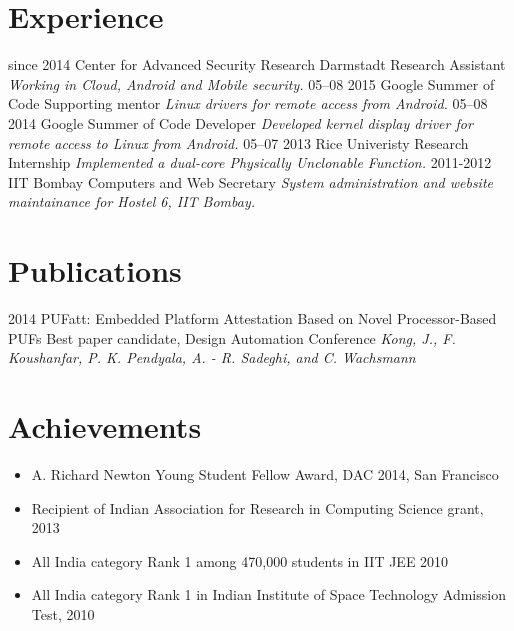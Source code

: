 \documentclass[]{friggeri-cv}
\begin{document}
\section{Experience}

\begin{entrylist}
  \entry
    {since 2014}
    {Center for Advanced Security Research Darmstadt}
    {Research Assistant}
    {\emph{Working in Cloud, Android and Mobile security.}}
  \entry
    {05–08 2015}
    {Google Summer of Code}
    {Supporting mentor}
    {\emph{Linux drivers for remote access from Android.}}
  \entry
    {05–08 2014}
    {Google Summer of Code}
    {Developer}
    {\emph{Developed kernel display driver for remote access to Linux from Android.}}
  \entry
    {05–07 2013}
    {Rice Univeristy}
    {Research Internship}
    {\emph{Implemented a dual-core Physically Unclonable Function.}}
  \entry
    {2011-2012}
    {IIT Bombay}
    {Computers and Web Secretary}
    {\emph{System administration and website maintainance for Hostel 6, IIT Bombay.}}
\end{entrylist}

\section{Publications}
\begin{entrylist}
  \entry
    {2014}
    {PUFatt: Embedded Platform Attestation Based on Novel Processor-Based PUFs}
    {Best paper candidate, Design Automation Conference}
    {\emph{Kong, J., F. Koushanfar, P. K. Pendyala, A. - R. Sadeghi, and C. Wachsmann}}
\end{entrylist}

\section{Achievements}
\begin{itemize}
  \item A. Richard Newton Young Student Fellow Award, DAC 2014, San Francisco
  \item Recipient of Indian Association for Research in Computing Science grant, 2013
  \item All India category Rank 1 among 470,000 students in IIT JEE 2010
  \item All India category Rank 1 in Indian Institute of Space Technology Admission Test, 2010
\end{itemize}
~
\end{document}
